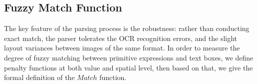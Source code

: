 \subsection{Fuzzy Match Function}
The key feature of the parsing process is the robustness:
rather than conducting exact match,
the parser tolerates the OCR recognition errors,
and the slight layout variances between images of the same format.
In order to measure the degree of fuzzy matching
between primitive expressions and text boxes,
we define penalty functions at both value and spatial level,
then based on that, we give the formal definition of the $Match$ function.



